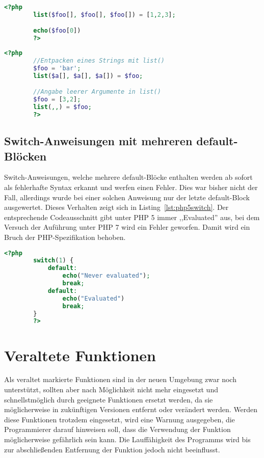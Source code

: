     \begin{lstlisting}[language=php, caption={Beispiel der Verwendung von list()}, label={lst:php5list}]
        <?php
        list($foo[], $foo[], $foo[]) = [1,2,3];

        echo($foo[0])
        ?>
    \end{lstlisting}

    \begin{lstlisting}[language=php, caption={Beispiel unerlaubter Verwendungen von list()}, label={lst:php5list1}]
        <?php
        //Entpacken eines Strings mit list()
        $foo = 'bar';
        list($a[], $a[], $a[]) = $foo;

        //Angabe leerer Argumente in list()
        $foo = [3,2];
        list(,,) = $foo;
        ?>
    \end{lstlisting}

    \subsection{Switch-Anweisungen mit mehreren default-Blöcken}\label{switch}
    Switch-Anweisungen, welche mehrere default-Blöcke enthalten werden ab sofort als fehlerhafte Syntax erkannt und werfen einen Fehler. Dies war bisher nicht der Fall,
    allerdings wurde bei einer solchen Anweisung nur der letzte default-Block ausgewertet. Dieses Verhalten zeigt sich in Listing~\ref{lst:php5switch}. Der entsprechende
    Codeausschnitt gibt unter \acs{PHP} 5 immer ,,Evaluated'' aus, bei dem Versuch der Auführung unter \acs{PHP} 7 wird ein Fehler geworfen. Damit wird ein Bruch der
    \acs{PHP}-Spezifikation \cite{php_group_php_nodate} behoben.

    \begin{lstlisting}[language=php, caption={Beispiel meherer default-Blöcke in Switch-Anweisungen}, label={lst:php5switch}]
        <?php
        switch(1) {
            default:
                echo("Never evaluated");
                break;
            default:
                echo("Evaluated")
                break;
        }
        ?>
    \end{lstlisting}


\section{Veraltete Funktionen}
Als veraltet markierte Funktionen sind in der neuen Umgebung zwar noch unterstützt, sollten aber nach Möglichkeit nicht mehr eingesetzt und schnellstmöglich durch geeignete 
Funktionen ersetzt werden, da sie möglicherweise in zukünftigen Versionen entfernt oder verändert werden. Werden diese Funktionen trotzdem eingesetzt, wird eine Warnung 
ausgegeben, die Programmierer darauf hinweisen soll, dass die Verwendung der Funktion möglicherweise gefährlich sein kann. Die Lauffähigkeit des Programms wird bis zur 
abschließenden Entfernung der Funktion jedoch nicht beeinflusst. \cite{oracle_how_2004}
